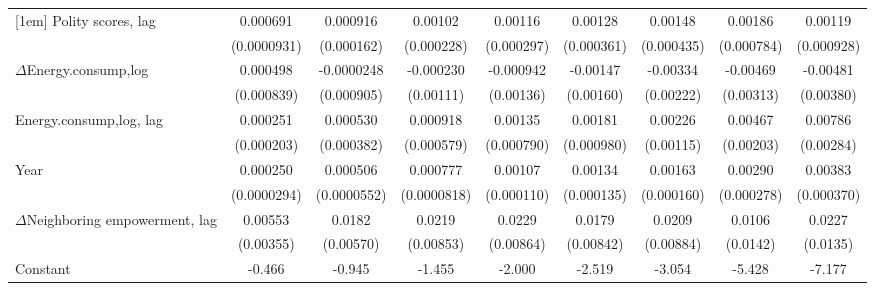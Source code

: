 \begin{table}[htbp]
\begin{tabular}{l*{8}{c}}
[1em]
Polity scores, lag          &    0.000691\sym{***}&    0.000916\sym{***}&     0.00102\sym{***}&     0.00116\sym{***}&     0.00128\sym{***}&     0.00148\sym{***}&     0.00186\sym{**} &     0.00119         \\
                    & (0.0000931)         &  (0.000162)         &  (0.000228)         &  (0.000297)         &  (0.000361)         &  (0.000435)         &  (0.000784)         &  (0.000928)         \\
[1em]
$\Delta$Energy.consump,log          &    0.000498         &  -0.0000248         &   -0.000230         &   -0.000942         &    -0.00147         &    -0.00334         &    -0.00469         &    -0.00481         \\
                    &  (0.000839)         &  (0.000905)         &   (0.00111)         &   (0.00136)         &   (0.00160)         &   (0.00222)         &   (0.00313)         &   (0.00380)         \\
[1em]
Energy.consump,log, lag             &    0.000251         &    0.000530         &    0.000918         &     0.00135\sym{*}  &     0.00181\sym{*}  &     0.00226\sym{*}  &     0.00467\sym{**} &     0.00786\sym{***}\\
                    &  (0.000203)         &  (0.000382)         &  (0.000579)         &  (0.000790)         &  (0.000980)         &   (0.00115)         &   (0.00203)         &   (0.00284)         \\
[1em]
Year                &    0.000250\sym{***}&    0.000506\sym{***}&    0.000777\sym{***}&     0.00107\sym{***}&     0.00134\sym{***}&     0.00163\sym{***}&     0.00290\sym{***}&     0.00383\sym{***}\\
                    & (0.0000294)         & (0.0000552)         & (0.0000818)         &  (0.000110)         &  (0.000135)         &  (0.000160)         &  (0.000278)         &  (0.000370)         \\
[1em]
$\Delta$Neighboring empowerment, lag&     0.00553         &      0.0182\sym{***}&      0.0219\sym{**} &      0.0229\sym{***}&      0.0179\sym{**} &      0.0209\sym{**} &      0.0106         &      0.0227\sym{*}  \\
                    &   (0.00355)         &   (0.00570)         &   (0.00853)         &   (0.00864)         &   (0.00842)         &   (0.00884)         &    (0.0142)         &    (0.0135)         \\
[1em]
Constant            &      -0.466\sym{***}&      -0.945\sym{***}&      -1.455\sym{***}&      -2.000\sym{***}&      -2.519\sym{***}&      -3.054\sym{***}&      -5.428\sym{***}&      -7.177\sym{***}\\

\end{tabular}
\end{table}
